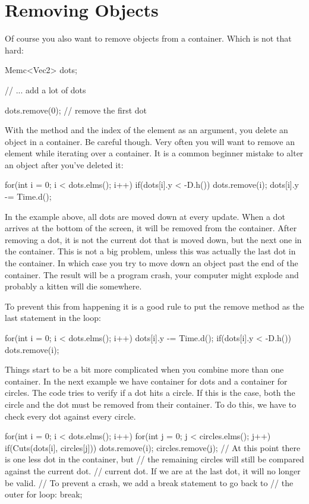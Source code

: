 \section{Removing Objects}
Of course you also want to remove objects from a container. Which is not that hard:

\begin{code}
Memc<Vec2> dots;

// ... add a lot of dots

dots.remove(0); // remove the first dot
\end{code}

With the method  and the index of the element as an argument, you delete an object in a container. Be careful though. Very often you will want to remove an element while iterating over a container. It is a common beginner mistake to alter an object after you've deleted it:

\begin{code}
for(int i = 0; i < dots.elms(); i++) {
  if(dots[i].y < -D.h()) {
    dots.remove(i);
	}
	dots[i].y -= Time.d();
}
\end{code}

In the example above, all dots are moved down at every update. When a dot arrives at the bottom of the screen, it will be removed from the container. After removing a dot, it is not the current dot that is moved down, but the next one in the container. This is not a big problem, unless this was actually the last dot in the container. In which case you try to move down an object past the end of the container. The result will be a program crash, your computer might explode and probably a kitten will die somewhere.

To prevent this from happening it is a good rule to put the remove method as the last statement in the loop:

\begin{code}
for(int i = 0; i < dots.elms(); i++) {
	dots[i].y -= Time.d();
  if(dots[i].y < -D.h()) dots.remove(i);
}
\end{code}

Things start to be a bit more complicated when you combine more than one container. In the next example we have container for dots and a container for circles. The code tries to verify if a dot hits a circle. If this is the case, both the circle and the dot must be removed from their container. To do this, we have to check every dot against every circle.

\begin{code}
for(int i = 0; i < dots.elms(); i++) {
	for(int j = 0; j < circles.elms(); j++) {
	    if(Cuts(dots[i], circles[j])) {
		    dots.remove(i);
		    circles.remove(j);
		    // At this point there is one less dot in the container, but  
		    // the remaining circles will still be compared against the current dot. 
		    // current dot. If we are at the last dot, it will no longer be valid. 
		    // To prevent a crash, we add a break statement to go back to 
		    // the outer for loop:
			  break;
		}		
	}
}
\end{code}

